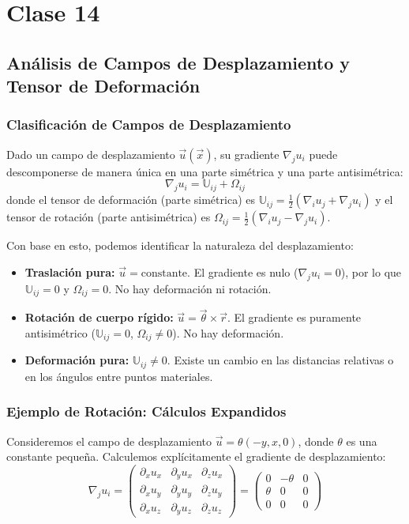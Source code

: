 \chapter{Clase 14}

\section{Análisis de Campos de Desplazamiento y Tensor de Deformación}

\subsection{Clasificación de Campos de Desplazamiento}

Dado un campo de desplazamiento $\vec{u}(\vec{x})$, su gradiente $\nabla_j u_i$ puede descomponerse de manera única en una parte simétrica y una parte antisimétrica:
$$ \nabla_j u_i = \mathbb{U}_{ij} + \Omega_{ij} $$
donde el tensor de deformación (parte simétrica) es $\mathbb{U}_{ij} = \frac{1}{2}(\nabla_i u_j + \nabla_j u_i)$ y el tensor de rotación (parte antisimétrica) es $\Omega_{ij} = \frac{1}{2}(\nabla_i u_j - \nabla_j u_i)$.

Con base en esto, podemos identificar la naturaleza del desplazamiento:
\begin{itemize}
\item \textbf{Traslación pura:} $\vec{u} = \text{constante}$. El gradiente es nulo ($\nabla_j u_i = 0$), por lo que $\mathbb{U}_{ij} = 0$ y $\Omega_{ij} = 0$. No hay deformación ni rotación.
\item \textbf{Rotación de cuerpo rígido:} $\vec{u} = \vec{\theta} \times \vec{r}$. El gradiente es puramente antisimétrico ($\mathbb{U}_{ij} = 0$, $\Omega_{ij} \neq 0$). No hay deformación.
\item \textbf{Deformación pura:} $\mathbb{U}_{ij} \neq 0$. Existe un cambio en las distancias relativas o en los ángulos entre puntos materiales.
\end{itemize}

\subsection{Ejemplo de Rotación: Cálculos Expandidos}

Consideremos el campo de desplazamiento $\vec{u} = \theta(-y, x, 0)$, donde $\theta$ es una constante pequeña. Calculemos explícitamente el gradiente de desplazamiento:
$$ \nabla_j u_i = \begin{pmatrix} \partial_x u_x & \partial_y u_x & \partial_z u_x \\ \partial_x u_y & \partial_y u_y & \partial_z u_y \\ \partial_x u_z & \partial_y u_z & \partial_z u_z \end{pmatrix} = \begin{pmatrix} 0 & -\theta & 0 \\ \theta & 0 & 0 \\ 0 & 0 & 0 \end{pmatrix} $$

